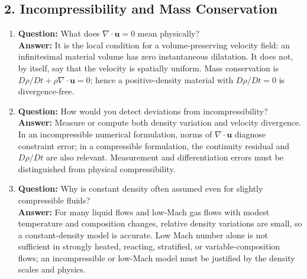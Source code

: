 \documentclass[12pt]{article}
\begin{document}
\subsection*{2. Incompressibility and Mass Conservation}
\begin{enumerate}
\item \textbf{Question:} What does $\nabla \cdot \mathbf{u} = 0$ mean physically?\\
\textbf{Answer:} It is the local condition for a volume-preserving velocity field: an infinitesimal material volume has zero instantaneous dilatation. It does not, by itself, say that the velocity is spatially uniform. Mass conservation is
$D\rho/Dt+\rho\nabla\cdot\mathbf{u}=0$; hence a positive-density material with $D\rho/Dt=0$ is divergence-free.

\item \textbf{Question:} How would you detect deviations from incompressibility?\\
\textbf{Answer:} Measure or compute both density variation and velocity divergence. In an incompressible numerical formulation, norms of $\nabla\cdot\mathbf{u}$ diagnose constraint error; in a compressible formulation, the continuity residual and $D\rho/Dt$ are also relevant. Measurement and differentiation errors must be distinguished from physical compressibility.

\item \textbf{Question:} Why is constant density often assumed even for slightly compressible fluids?\\
\textbf{Answer:} For many liquid flows and low-Mach gas flows with modest temperature and composition changes, relative density variations are small, so a constant-density model is accurate. Low Mach number alone is not sufficient in strongly heated, reacting, stratified, or variable-composition flows; an incompressible or low-Mach model must be justified by the density scales and physics.
\end{enumerate}
\end{document}
